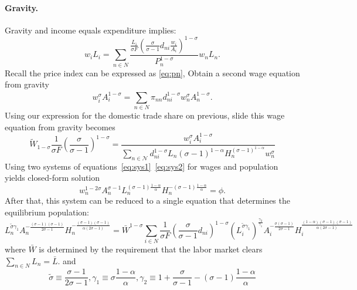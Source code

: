 \documentclass[11pt,a4paper]{article}
\begin{document}
\paragraph{Gravity.}
Gravity and income equals expenditure implies: 
\begin{equation}
  w_i L_i = \sum_{n \in N}^{} \frac{\frac{L_i}{\sigma F} \left( \frac{\sigma }{\sigma -1} d_{ni} \frac{w_i}{A_i} \right)^{1-\sigma }}{P_n^{1-\sigma }} w_n L_n.
\end{equation}
Recall the price index can be expressed as \eqref{eq:pn}, Obtain a second wage equation from gravity \begin{equation}
  w_i^\sigma A_i^{1-\sigma } = \sum_{n \in N}^{} \pi _{nn} d_{ni}^{1-\sigma } w_n^\sigma A_n^{1-\sigma }.
\end{equation}
Using our expression for the domestic trade share on previous, slide this wage equation from gravity becomes
\begin{equation}
\tilde{W}_{1-\sigma} \frac{1}{\sigma F} \left( \frac{\sigma}{\sigma - 1} \right)^{1-\sigma} = \frac{w_i^{\sigma} A_i^{1-\sigma}}{\sum_{n \in \mathcal{N}} d_{ni}^{1-\sigma} L_n (\sigma - 1)^{1-\alpha} H_n^{(\sigma - 1)^{1-\alpha}} w_n^{\sigma}}\label{eq:sys2}
\end{equation}
Using two systems of equations~\eqref{eq:sys1}~\eqref{eq:sys2} for wages and population yields closed-form solution 
\begin{equation}
  w_n^{1-2\sigma} A_n^{\sigma -1} L_n^{(\sigma -1)\frac{1-\alpha }{\alpha }} H_n^{-(\sigma -1)\frac{1-\alpha }{\alpha }} = \phi .\label{eq:wage}
\end{equation}
After that, this system can be reduced to a single equation that determines the equilibrium population:
\begin{equation}
  L_n ^{\tilde{\sigma }\gamma _1} A_n ^{- \frac{(\sigma -1) (\sigma -1)}{2\sigma - 1}} H_n ^{- \frac{(\sigma -1) (\sigma -1)}{\alpha(2\sigma - 1)}} = \bar{W}^{1-\sigma } \sum_{i \in N}^{} \frac{1}{\sigma F} \left( \frac{\sigma }{\sigma -1} d_{ni} \right)^{1-\sigma } \left( L_i ^{\tilde{\sigma }\gamma _1} \right)^{\frac{\gamma _2}{\gamma _1}} A_i ^{- \frac{\sigma (\sigma -1)}{2\sigma - 1}} H_i ^{\frac{(1-\alpha)(\sigma -1) (\sigma -1)}{\alpha(2\sigma - 1)}}\label{eq:pop}
\end{equation}
where $\bar{W}$ is determined by the requirement that the labor market clears $\sum_{n \in N}^{} L_n = \bar{L}$. 
and $$ \tilde{\sigma } \equiv \frac{\sigma -1}{2 \sigma -1}, \gamma _1 \equiv \sigma \frac{1-\alpha }{\alpha }, \gamma _2 \equiv 1 + \frac{\sigma }{\sigma -1}- (\sigma -1) \frac{1-\alpha }{\alpha } $$
\end{document}
